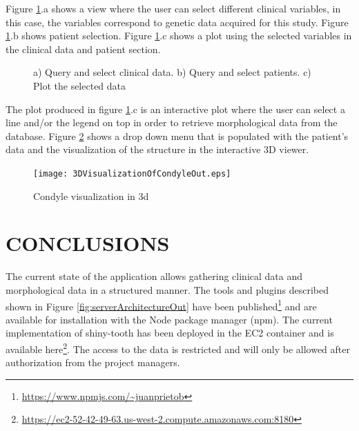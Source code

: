 \documentclass[]{spie}  %
\begin{document}
Figure \ref{fig:queryAndSelect}.a shows a view where the user can select different clinical variables, in this case, the variables correspond to genetic data
acquired for this study. Figure \ref{fig:queryAndSelect}.b shows patient selection. Figure \ref{fig:queryAndSelect}.c shows a plot using the selected 
variables in the clinical data and patient section. 

\begin{figure}
	\centering 
	\caption[Import and generate clinical data]{a) Query and select clinical data. b) Query and select patients. c) Plot the selected data}
	\label{fig:queryAndSelect}
\end{figure} 

The plot produced in figure \ref{fig:queryAndSelect}.c is an interactive plot where the user can select a line and/or the legend on top 
in order to retrieve morphological data from the database. Figure \ref{fig:3DVisualizationOfCondyle} shows a drop down menu that is populated 
with the patient's data and the visualization of the structure in the interactive 3D viewer.

\begin{figure}
	\centering 
	\texttt{[image: 3DVisualizationOfCondyleOut.eps]}
	\caption[Visualization]{Condyle visualization in 3d}
	\label{fig:3DVisualizationOfCondyle}
\end{figure}

\section{CONCLUSIONS} 

The current state of the application allows gathering clinical data and morphological data in a structured manner. 
The tools and plugins described shown in Figure \ref{fig:serverArchitectureOut} have been published\footnote{\url{https://www.npmjs.com/~juanprietob}} and are available for installation with the Node package manager (npm). 
The current implementation of shiny-tooth has been deployed in the EC2 container and is available here\footnote{\url{https://ec2-52-42-49-63.us-west-2.compute.amazonaws.com:8180}}. The access to the data is restricted and will only be allowed after authorization from the project managers. 



\scriptsize
\end{document}
